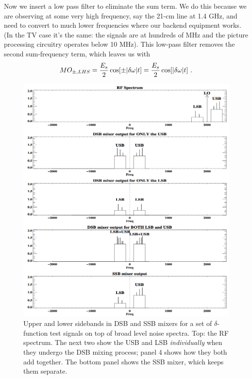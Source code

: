 \documentclass[12pt,preprint]{aastex}
\begin{document}
        Now we insert a low pass filter to eliminate the sum term. We do
this because we are observing at some very high frequency, say the 21-cm
line at 1.4 GHz, and need to convert to much lower frequencies where our
backend equipment works. (In the TV case it's the same: the signals are
at hundreds of MHz and the picture processing circuitry operates below
10 MHz). This low-pass filter removes the second sum-frequency term, which
leaves us with
%
  \begin{equation} \label{eqn5} \label{baseband}
MO_{\pm, LHS} = {E_s \over 2} \cos [\pm|\delta \omega | t] = {E_s \over
  2}
   \cos [|\delta \omega | t] \ .
\end{equation}
%
\begin{figure}[p!]
  \includegraphics[width=6.5in]{sideband.png}
\caption{Upper and lower sidebands in DSB and SSB mixers for a set of
$\delta$-function test signals on top of broad level noise spectra. Top:
  the RF
spectrum. The next two show the USB and LSB {\it individually} when
they undergo the DSB mixing process; panel 4 shows how they both add
together. The bottom panel shows the SSB mixer, which keeps them
separate. \label{sideband}}
\end{figure}
\end{document}
